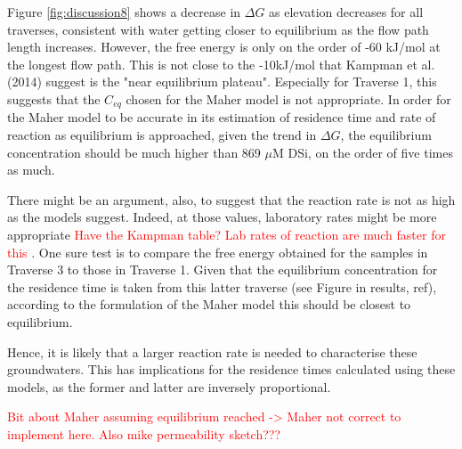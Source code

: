 Figure \ref{fig:discussion8} shows a decrease in $\Delta G$ as elevation decreases for all traverses, consistent with water getting closer to equilibrium as the flow path length increases. However, the free energy is only on the order of -60 kJ/mol at the longest flow path. This is not close to the -10kJ/mol that Kampman et al. (2014) suggest is the "near equilibrium plateau". Especially for Traverse 1, this suggests that the $C_{eq}$ chosen for the Maher model is not appropriate. In order for the Maher model to be accurate in its estimation of residence time and rate of reaction as equilibrium is approached, given the trend in $\Delta G$, the equilibrium concentration should be much higher than 869 $\mu$M DSi, on the order of five times as much.

\bsk

There might be an argument, also, to suggest that the reaction rate is not as high as the models suggest. Indeed, at those values, laboratory rates might be more appropriate \textcolor{red}{Have the Kampman table? Lab rates of reaction are much faster for this }. One sure test is to compare the free energy obtained for the samples in Traverse 3 to those in Traverse 1. Given that the equilibrium concentration for the residence time is taken from this latter traverse (see Figure in results, ref), according to the formulation of the Maher model this should be closest to equilibrium.

\bsk
 Hence, it is likely that a larger reaction rate is needed to characterise these groundwaters. This has implications for the residence times calculated using these models, as the former and latter are inversely proportional.


\textcolor{red}{Bit about Maher assuming equilibrium reached -> Maher not correct to implement here. Also mike permeability sketch???}


